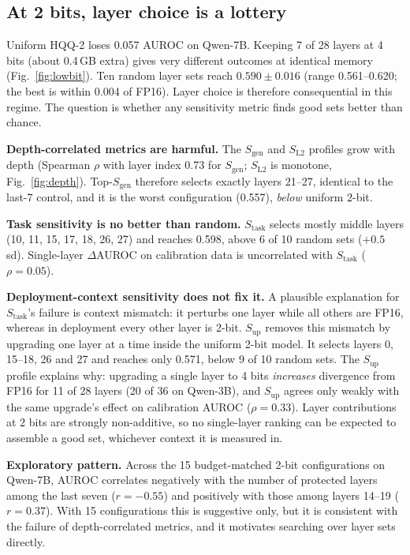 \documentclass[conference]{IEEEtran}
\newcommand{\stask}{S_{\text{task}}}
\newcommand{\sgen}{S_{\text{gen}}}
\newcommand{\slt}{S_{\text{L2}}}
\newcommand{\sUp}{S_{\text{up}}}
\begin{document}
\subsection{At 2 bits, layer choice is a lottery}\label{sec:twobit}
Uniform HQQ-2 loses 0.057 AUROC on Qwen-7B. Keeping 7 of 28 layers at 4 bits (about 0.4\,GB extra) gives very different outcomes at identical memory (Fig.~\ref{fig:lowbit}). Ten random layer sets reach $0.590 \pm 0.016$ (range 0.561--0.620; the best is within 0.004 of FP16). Layer choice is therefore consequential in this regime. The question is whether any sensitivity metric finds good sets better than chance.

\textbf{Depth-correlated metrics are harmful.} The $\sgen$ and $\slt$ profiles grow with depth (Spearman $\rho$ with layer index 0.73 for $\sgen$; $\slt$ is monotone, Fig.~\ref{fig:depth}). Top-$\sgen$ therefore selects exactly layers 21--27, identical to the last-7 control, and it is the worst configuration (0.557), \emph{below} uniform 2-bit.

\textbf{Task sensitivity is no better than random.} $\stask$ selects mostly middle layers (10, 11, 15, 17, 18, 26, 27) and reaches 0.598, above 6 of 10 random sets ($+0.5$ sd). Single-layer $\Delta$AUROC on calibration data is uncorrelated with $\stask$ ($\rho = 0.05$).

\textbf{Deployment-context sensitivity does not fix it.} A plausible explanation for $\stask$'s failure is context mismatch: it perturbs one layer while all others are FP16, whereas in deployment every other layer is 2-bit. $\sUp$ removes this mismatch by upgrading one layer at a time inside the uniform 2-bit model. It selects layers 0, 15--18, 26 and 27 and reaches only 0.571, below 9 of 10 random sets. The $\sUp$ profile explains why: upgrading a single layer to 4 bits \emph{increases} divergence from FP16 for 11 of 28 layers (20 of 36 on Qwen-3B), and $\sUp$ agrees only weakly with the same upgrade's effect on calibration AUROC ($\rho = 0.33$). Layer contributions at 2 bits are strongly non-additive, so no single-layer ranking can be expected to assemble a good set, whichever context it is measured in.

\textbf{Exploratory pattern.} Across the 15 budget-matched 2-bit configurations on Qwen-7B, AUROC correlates negatively with the number of protected layers among the last seven ($r = -0.55$) and positively with those among layers 14--19 ($r = 0.37$). With 15 configurations this is suggestive only, but it is consistent with the failure of depth-correlated metrics, and it motivates searching over layer sets directly.
\end{document}
